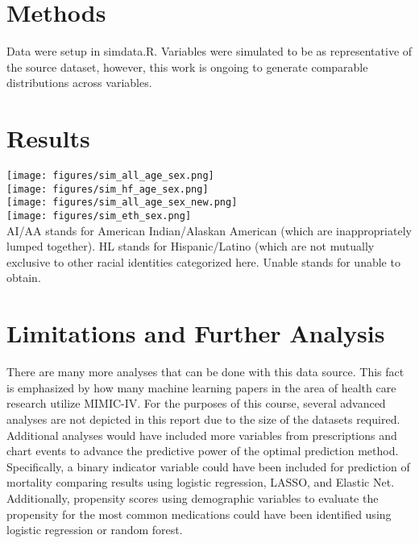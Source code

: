 \documentclass{article}
\begin{document}
\section{Methods}
Data were setup in simdata.R. Variables were simulated to be as representative of the source dataset, however, this work is ongoing to generate comparable distributions across variables. 
\section{Results}
\texttt{[image: figures/sim\_all\_age\_sex.png]}\\
\texttt{[image: figures/sim\_hf\_age\_sex.png]}\\
\texttt{[image: figures/sim\_all\_age\_sex\_new.png]}\\
\texttt{[image: figures/sim\_eth\_sex.png]}\\
AI/AA stands for American Indian/Alaskan American (which are inappropriately lumped together). HL stands for Hispanic/Latino (which are not mutually exclusive to other racial identities categorized here. Unable stands for unable to obtain.
\section{Limitations and Further Analysis}
There are many more analyses that can be done with this data source. This fact is emphasized by how many machine learning papers in the area of health care research utilize MIMIC-IV. For the purposes of this course, several advanced analyses are not depicted in this report due to the size of the datasets required. Additional analyses would have included more variables from prescriptions and chart events to advance the predictive power of the optimal prediction method. Specifically, a binary indicator variable could have been included for prediction of mortality comparing results using logistic regression, LASSO, and Elastic Net. Additionally, propensity scores using demographic variables to evaluate the propensity for the most common medications could have been identified using logistic regression or random forest. 
\end{document}
